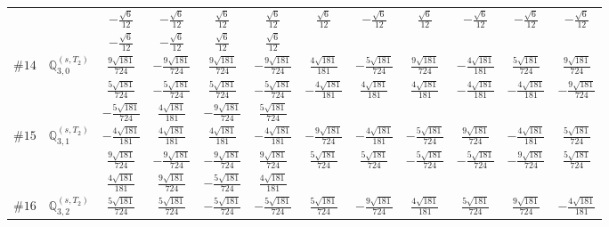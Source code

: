\documentclass[fleqn,9pt,landscape]{jsarticle}
\begin{document}
\begin{center}
\begin{longtable}{lcccccccccc}
& $ - \frac{\sqrt{6}}{12} $ & $ - \frac{\sqrt{6}}{12} $ & $ \frac{\sqrt{6}}{12} $ & $ \frac{\sqrt{6}}{12} $ & $ \frac{\sqrt{6}}{12} $ & $ - \frac{\sqrt{6}}{12} $ & $ \frac{\sqrt{6}}{12} $ & $ - \frac{\sqrt{6}}{12} $ & $ - \frac{\sqrt{6}}{12} $ & $ - \frac{\sqrt{6}}{12} $ \\
& $ - \frac{\sqrt{6}}{12} $ & $ - \frac{\sqrt{6}}{12} $ & $ \frac{\sqrt{6}}{12} $ & $ \frac{\sqrt{6}}{12} $ & $  $ & $  $ & $  $ & $  $ & $  $ & $  $ \\ \hline
$ \#14\quad \mathbb{Q}_{3,0}^{(s,T_{2})} $ & $ \frac{9 \sqrt{181}}{724} $ & $ - \frac{9 \sqrt{181}}{724} $ & $ \frac{9 \sqrt{181}}{724} $ & $ - \frac{9 \sqrt{181}}{724} $ & $ \frac{4 \sqrt{181}}{181} $ & $ - \frac{5 \sqrt{181}}{724} $ & $ \frac{9 \sqrt{181}}{724} $ & $ - \frac{4 \sqrt{181}}{181} $ & $ \frac{5 \sqrt{181}}{724} $ & $ \frac{9 \sqrt{181}}{724} $ \\
& $ \frac{5 \sqrt{181}}{724} $ & $ - \frac{5 \sqrt{181}}{724} $ & $ \frac{5 \sqrt{181}}{724} $ & $ - \frac{5 \sqrt{181}}{724} $ & $ - \frac{4 \sqrt{181}}{181} $ & $ \frac{4 \sqrt{181}}{181} $ & $ \frac{4 \sqrt{181}}{181} $ & $ - \frac{4 \sqrt{181}}{181} $ & $ - \frac{4 \sqrt{181}}{181} $ & $ - \frac{9 \sqrt{181}}{724} $ \\
& $ - \frac{5 \sqrt{181}}{724} $ & $ \frac{4 \sqrt{181}}{181} $ & $ - \frac{9 \sqrt{181}}{724} $ & $ \frac{5 \sqrt{181}}{724} $ & $  $ & $  $ & $  $ & $  $ & $  $ & $  $ \\ \hline
$ \#15\quad \mathbb{Q}_{3,1}^{(s,T_{2})} $ & $ - \frac{4 \sqrt{181}}{181} $ & $ \frac{4 \sqrt{181}}{181} $ & $ \frac{4 \sqrt{181}}{181} $ & $ - \frac{4 \sqrt{181}}{181} $ & $ - \frac{9 \sqrt{181}}{724} $ & $ - \frac{4 \sqrt{181}}{181} $ & $ - \frac{5 \sqrt{181}}{724} $ & $ \frac{9 \sqrt{181}}{724} $ & $ - \frac{4 \sqrt{181}}{181} $ & $ \frac{5 \sqrt{181}}{724} $ \\
& $ \frac{9 \sqrt{181}}{724} $ & $ - \frac{9 \sqrt{181}}{724} $ & $ - \frac{9 \sqrt{181}}{724} $ & $ \frac{9 \sqrt{181}}{724} $ & $ \frac{5 \sqrt{181}}{724} $ & $ \frac{5 \sqrt{181}}{724} $ & $ - \frac{5 \sqrt{181}}{724} $ & $ - \frac{5 \sqrt{181}}{724} $ & $ - \frac{9 \sqrt{181}}{724} $ & $ \frac{5 \sqrt{181}}{724} $ \\
& $ \frac{4 \sqrt{181}}{181} $ & $ \frac{9 \sqrt{181}}{724} $ & $ - \frac{5 \sqrt{181}}{724} $ & $ \frac{4 \sqrt{181}}{181} $ & $  $ & $  $ & $  $ & $  $ & $  $ & $  $ \\ \hline
$ \#16\quad \mathbb{Q}_{3,2}^{(s,T_{2})} $ & $ \frac{5 \sqrt{181}}{724} $ & $ \frac{5 \sqrt{181}}{724} $ & $ - \frac{5 \sqrt{181}}{724} $ & $ - \frac{5 \sqrt{181}}{724} $ & $ \frac{5 \sqrt{181}}{724} $ & $ - \frac{9 \sqrt{181}}{724} $ & $ \frac{4 \sqrt{181}}{181} $ & $ \frac{5 \sqrt{181}}{724} $ & $ \frac{9 \sqrt{181}}{724} $ & $ - \frac{4 \sqrt{181}}{181} $ \\

\end{longtable}
\end{center}
\end{document}
